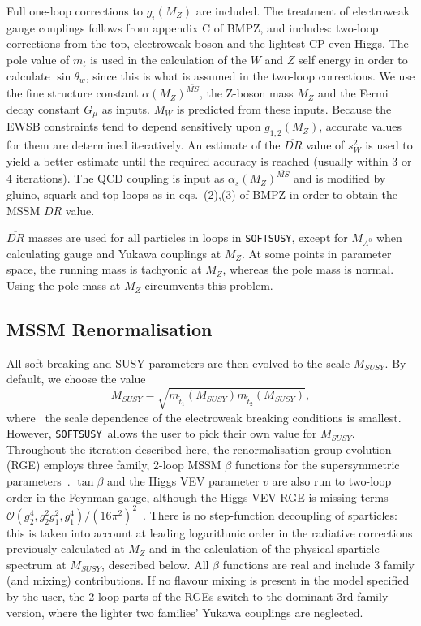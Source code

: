 \documentclass[]{article}
\def\SOFTSUSY{{\tt SOFTSUSY}}
\begin{document}
Full one-loop corrections to $g_i(M_Z)$ are
included. 
The treatment of electroweak gauge couplings follows
from appendix C of BMPZ, and includes: two-loop corrections 
from the top, electroweak boson and the lightest CP-even Higgs. The pole value
of $m_t$ is used in the calculation of the $W$ and $Z$ self energy in order to
calculate $\sin \theta_w$, since this is what is assumed in the two-loop
corrections. 
We use the fine structure constant $\alpha(M_Z)^{\overline{MS}}$, the Z-boson
mass 
$M_Z$ and the Fermi decay constant $G_\mu$ as inputs. $M_W$ is predicted from
these inputs.
Because the EWSB constraints tend to 
depend sensitively upon $g_{1,2}(M_Z)$, accurate values for them are
determined iteratively. 
An estimate of the $\overline{DR}$ value of $s_W^2$ is used to yield a
better estimate until the required accuracy is reached (usually within 3 or
4 iterations).
The QCD coupling is input as $\alpha_s(M_Z)^{\overline{MS}}$ and
is modified by gluino, squark and top loops as in
eqs.~(2),(3) of BMPZ in order to obtain the MSSM $\overline{DR}$ value. 

$\overline{DR}$ masses are used for all particles in loops in \SOFTSUSY, except
for $M_{A^0}$ when calculating gauge and Yukawa couplings at $M_Z$. At some
points in parameter space, the running mass is tachyonic at $M_Z$, whereas the
pole mass is normal. Using the pole mass at $M_Z$ circumvents this problem.

\subsection{MSSM Renormalisation}

All soft breaking and SUSY parameters are then evolved to the scale
$M_{SUSY}$. By default, we choose the value
\begin{equation}
M_{SUSY} =\sqrt{m_{{\tilde t}_1}(M_{SUSY}) m_{{\tilde t}_2}(M_{SUSY})}, \label{msusy}
\end{equation}
where~\cite{Casas:1998vh} the scale dependence of the electroweak
breaking conditions is smallest. However, \SOFTSUSY~allows the user to pick
their own value for $M_{SUSY}$.
Throughout the iteration described here, the renormalisation group evolution
(RGE) employs three family,
2-loop MSSM $\beta$ functions for the supersymmetric
parameters~\cite{Barger:1994gh}.
$\tan \beta$ and the Higgs VEV
parameter $v$ are also run to two-loop order in the Feynman gauge, although
the Higgs VEV RGE is missing terms ${\mathcal O}(g_2^4, g_2^2 g_1^2,
g_1^4) / (16 \pi^2)^2$~\cite{Martin:2001vx,Yamada:2001ck}. 
There is no
step-function decoupling of sparticles: this is taken into account at leading
logarithmic order in the radiative corrections previously calculated at $M_Z$
and in the calculation of the physical sparticle spectrum at $M_{SUSY}$, described
below. All $\beta$ functions are real and include 3 family (and mixing)
contributions. If no flavour mixing is present in the model specified by the
user, the 2-loop parts of the RGEs switch to the dominant 3rd-family version,
where the lighter two families' Yukawa couplings are neglected.
\end{document}
